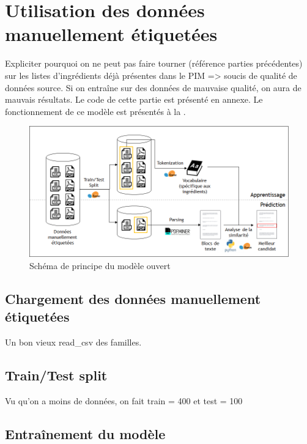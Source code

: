     \chapter{Utilisation des données manuellement étiquetées}

    Expliciter pourquoi on ne peut pas faire tourner (référence parties précédentes) sur les listes d'ingrédients déjà présentes dans le PIM => soucis de qualité de données source. 
    Si on entraîne sur des données de mauvaise qualité, on aura de mauvais résultats.
    Le code de cette partie est présenté en annexe.    
    Le fonctionnement de ce modèle est présentés à la .
    
    \begin{figure}[htbp]
        \begin{center}
        \includegraphics[width=0.9\linewidth]{img/ground_truth_model.png}
        \end{center}
        \caption{Schéma de principe du \og modèle ouvert \fg}
        \label{fig:ground_truth_model}
    \end{figure}     


        \section{Chargement des données manuellement étiquetées}

        Un bon vieux read\_csv des familles.

        \section{Train/Test split}

        Vu qu'on a moins de données, on fait train = 400 et test = 100

        \section{Entraînement du modèle}


